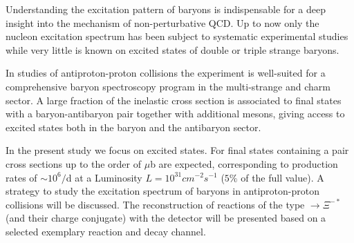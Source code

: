 Understanding the excitation pattern of baryons is indispensable for a deep insight into the mechanism of non-perturbative QCD. 
Up to now only the nucleon excitation spectrum has been subject to systematic experimental studies while very little is known 
on excited states of double or triple strange baryons.

\noindent In studies of antiproton-proton collisions the \panda experiment is well-suited for a comprehensive baryon spectroscopy program
in the multi-strange and charm sector. 
A large fraction of the inelastic \pbarp cross section is associated to final states with a baryon-antibaryon pair together with 
additional mesons, giving access to excited states both in the baryon and the antibaryon sector.

\noindent In the present study we focus on excited \cascade states. For final states containing a \cascade\anticascade pair cross sections 
up to the order of $\mu$b are expected, corresponding to production rates of $\sim 10^6/$d at a Luminosity $L=10^{31} \unit{cm}^{-2} \unit{s}^{-1}$
 ($5\%$ of the full value).
A strategy to study the excitation spectrum of \cascade baryons in antiproton-proton collisions will be discussed. The reconstruction of 
reactions of the type \pbarp $\rightarrow \Xi^{-*}$\anticascade (and their charge conjugate) with the \panda detector will be presented 
based on a selected exemplary reaction and decay channel.